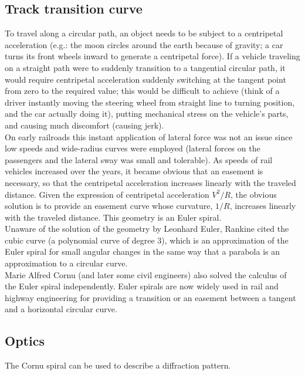 \documentclass[a4paper, 10pt]{article}
\begin{document}
\subsection{Track transition curve}
To travel along a circular path, an object needs to be subject to a centripetal acceleration (e.g.: the moon circles around the earth because of gravity; a car turns its front wheels inward to generate a centripetal force). If a vehicle traveling on a straight path were to suddenly transition to a tangential circular path, it would require centripetal acceleration suddenly switching at the tangent point from zero to the required value; this would be difficult to achieve (think of a driver instantly moving the steering wheel from straight line to turning position, and the car actually doing it), putting mechanical stress on the vehicle's parts, and causing much discomfort (causing jerk). \\

On early railroads this instant application of lateral force was not an issue since low speeds and wide-radius curves were employed (lateral forces on the passengers and the lateral sway was small and tolerable). As speeds of rail vehicles increased over the years, it became obvious that an easement is necessary, so that the centripetal acceleration increases linearly with the traveled distance. Given the expression of centripetal acceleration $V^2/R$, the obvious solution is to provide an easement curve whose curvature, $1/R$, increases linearly with the traveled distance. This geometry is an Euler spiral. \\

Unaware of the solution of the geometry by Leonhard Euler, Rankine cited the cubic curve (a polynomial curve of degree 3), which is an approximation of the Euler spiral for small angular changes in the same way that a parabola is an approximation to a circular curve. \\

Marie Alfred Cornu (and later some civil engineers) also solved the calculus of the Euler spiral independently. Euler spirals are now widely used in rail and highway engineering for providing a transition or an easement between a tangent and a horizontal circular curve.

\subsection{Optics}
The Cornu spiral can be used to describe a diffraction pattern. \cite{ref1}
\end{document}
